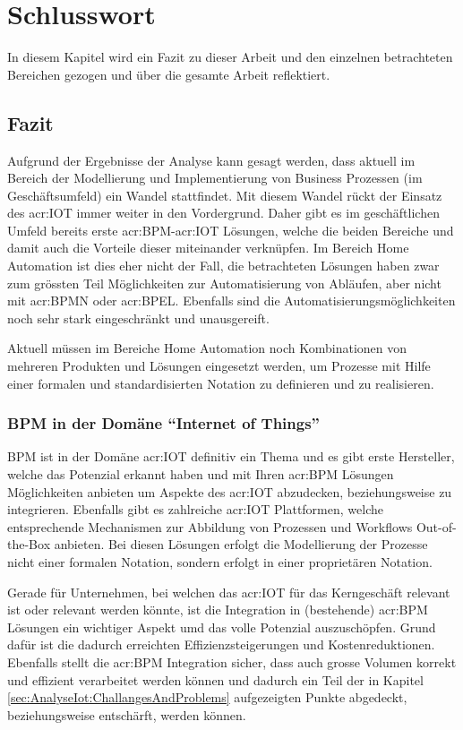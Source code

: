 
\chapter{Schlusswort} \label{chap:Finish}
In diesem Kapitel wird ein Fazit zu dieser Arbeit und den einzelnen betrachteten Bereichen gezogen und über die gesamte Arbeit reflektiert.

\section{Fazit}
Aufgrund der Ergebnisse der Analyse kann gesagt werden, dass aktuell im Bereich der Modellierung und Implementierung von Business Prozessen (im Geschäftsumfeld) ein Wandel stattfindet. Mit diesem Wandel rückt der Einsatz des \gls{acr:IOT} immer weiter in den Vordergrund. Daher gibt es im geschäftlichen Umfeld bereits erste \gls{acr:BPM}-\gls{acr:IOT} Lösungen, welche die beiden Bereiche und damit auch die Vorteile dieser miteinander verknüpfen. Im Bereich Home Automation ist dies eher nicht der Fall, die betrachteten Lösungen haben zwar zum grössten Teil Möglichkeiten zur Automatisierung von Abläufen, aber nicht mit \gls{acr:BPMN} oder \gls{acr:BPEL}. Ebenfalls sind die Automatisierungsmöglichkeiten noch sehr stark eingeschränkt und unausgereift.

Aktuell müssen im Bereiche Home Automation noch Kombinationen von mehreren Produkten und Lösungen eingesetzt werden, um Prozesse mit Hilfe einer formalen und standardisierten Notation zu definieren und zu realisieren.

\subsection{BPM in der Domäne "`Internet of Things"'}
BPM ist in der Domäne \gls{acr:IOT} definitiv ein Thema und es gibt erste Hersteller, welche das Potenzial erkannt haben und mit Ihren \gls{acr:BPM} Lösungen Möglichkeiten anbieten um Aspekte des \gls{acr:IOT} abzudecken, beziehungsweise zu integrieren. Ebenfalls gibt es zahlreiche \gls{acr:IOT} Plattformen, welche entsprechende Mechanismen zur Abbildung von Prozessen und Workflows Out-of-the-Box anbieten. Bei diesen Lösungen erfolgt die Modellierung der Prozesse nicht einer formalen Notation, sondern erfolgt in einer proprietären Notation.

Gerade für Unternehmen, bei welchen das \gls{acr:IOT} für das Kerngeschäft relevant ist oder relevant werden könnte, ist die Integration in (bestehende) \gls{acr:BPM} Lösungen ein wichtiger Aspekt umd das volle Potenzial auszuschöpfen. Grund dafür ist die dadurch erreichten Effizienzsteigerungen und Kostenreduktionen. Ebenfalls stellt die \gls{acr:BPM} Integration sicher, dass auch grosse Volumen korrekt und effizient verarbeitet werden können und dadurch ein Teil der in Kapitel \ref{sec:AnalyseIot:ChallangesAndProblems}  aufgezeigten Punkte abgedeckt, beziehungsweise entschärft, werden können.


